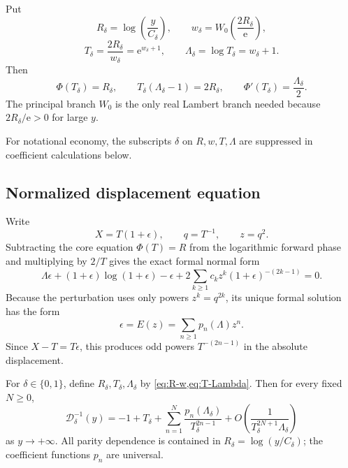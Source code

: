 \documentclass[11pt,oneside]{article}
\theoremstyle{plain}
\theoremstyle{definition}
\theoremstyle{remark}
\newcommand{\e}{\mathrm e}
\newcommand{\W}{W}
\newcommand{\DF}{\mathcal D}
\begin{document}
Put
\begin{equation}
 R_\delta=\log\!\left(\frac y{C_\delta}\right),
 \qquad
 w_\delta=\W_0\!\left(\frac{2R_\delta}{\e}\right),
 \label{eq:R-w}
\end{equation}
\begin{equation}
 T_\delta=\frac{2R_\delta}{w_\delta}=\e^{w_\delta+1},
 \qquad
 \Lambda_\delta=\log T_\delta=w_\delta+1.
 \label{eq:T-Lambda}
\end{equation}
Then
\begin{equation}
 \Phi(T_\delta)=R_\delta,
 \qquad
 T_\delta(\Lambda_\delta-1)=2R_\delta,
 \qquad
 \Phi'(T_\delta)=\frac{\Lambda_\delta}{2}.
 \label{eq:core-identities}
\end{equation}
The principal branch \(W_0\) is the only real Lambert branch needed because
\(2R_\delta/\e>0\) for large \(y\).

For notational economy, the subscripts \(\delta\) on \(R,w,T,\Lambda\) are
suppressed in coefficient calculations below.

\subsection{Normalized displacement equation}

Write
\begin{equation}
 X=T(1+\epsilon),
 \qquad q=T^{-1},
 \qquad z=q^2.
 \label{eq:epsilon-def}
\end{equation}
Subtracting the core equation \(\Phi(T)=R\) from the logarithmic forward phase
and multiplying by \(2/T\) gives the exact formal normal form
\begin{equation}
 \Lambda\epsilon+(1+\epsilon)\log(1+\epsilon)-\epsilon
 +2\sum_{k\ge1}c_kz^k(1+\epsilon)^{-(2k-1)}=0.
 \label{eq:normalized-inverse}
\end{equation}
Because the perturbation uses only powers \(z^k=q^{2k}\), its unique formal
solution has the form
\begin{equation}
 \epsilon=E(z)=\sum_{n\ge1}p_n(\Lambda)z^n.
 \label{eq:E-series}
\end{equation}
Since \(X-T=T\epsilon\), this produces odd powers
\(T^{-(2n-1)}\) in the absolute displacement.

\begin{mainbox}
For \(\delta\in\{0,1\}\), define \(R_\delta,T_\delta,\Lambda_\delta\) by
\cref{eq:R-w,eq:T-Lambda}.  Then for every fixed \(N\ge0\),
\begin{equation}
 \boxed{
 \DF_\delta^{-1}(y)
 =-1+T_\delta+
 \sum_{n=1}^{N}\frac{p_n(\Lambda_\delta)}{T_\delta^{2n-1}}
 +O\!\left(\frac1{T_\delta^{2N+1}\Lambda_\delta}\right)}
 \label{eq:inverse-main}
\end{equation}
as \(y\to+\infty\).  All parity dependence is contained in
\(R_\delta=\log(y/C_\delta)\); the coefficient functions \(p_n\) are universal.
\end{mainbox}
\end{document}
